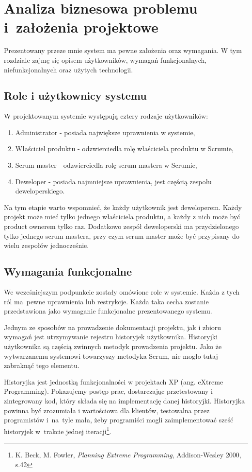\chapter{Analiza biznesowa problemu i~założenia projektowe}
Prezentowany przeze mnie system ma pewne założenia oraz wymagania. W tym rozdziale zajmę się opisem użytkowników, wymagań funkcjonalnych, niefunkcjonalnych oraz użytych technologii. 

\section{Role i użytkownicy systemu}
W projektowanym systemie występują cztery rodzaje użytkowników:

\begin{enumerate}
	\item Administrator - posiada największe uprawnienia w systemie,
	\item Właściciel produktu - odzwierciedla rolę właściciela produktu w Scrumie,
	\item Scrum master - odzwierciedla rolę scrum mastera w Scrumie,
	\item Deweloper - posiada najmniejsze uprawnienia, jest częścią zespołu deweloperskiego.
\end{enumerate} 

Na tym etapie warto wspomnieć, że każdy użytkownik jest deweloperem. Każdy projekt może mieć tylko jednego właściciela produktu, a każdy z nich może być product ownerem tylko raz. Dodatkowo zespół deweloperski ma przydzielonego tylko jednego scrum mastera, przy czym scrum master może być przypisany do wielu zespołów jednocześnie.

\section{Wymagania funkcjonalne}
We wcześniejszym podpunkcie zostały omówione role w systemie. Każda z tych ról ma~pewne uprawnienia lub restrykcje. Każda taka cecha zostanie przedstawiona jako wymaganie funkcjonalne prezentowanego systemu.

Jednym ze sposobów na prowadzenie dokumentacji projektu, jak i zbioru wymagań jest utrzymywanie rejestru historyjek użytkownika. Historyjki użytkownika są częścią zwinnych metodyk prowadzenia projektu. Jako że wytwarzanemu systemowi towarzyszy metodyka Scrum, nie mogło tutaj zabraknąć tego elementu.

\begin{italicquote}
	Historyjka jest jednostką funkcjonalności w projektach XP (ang. eXtreme Programming). Pokazujemy postęp prac, dostarczając przetestowany i zintegrowany kod, który składa się na implementację danej historyjki. Historyjka powinna być zrozumiała i wartościowa dla klientów, testowalna przez programistów i~na~tyle mała, żeby programiści mogli zaimplementować sześć historyjek w~trakcie jednej iteracji\footnote{K. Beck, M. Fowler, \textit{Planning Extreme Programming}, Addison-Wesley 2000, s.42}.
\end{italicquote}

